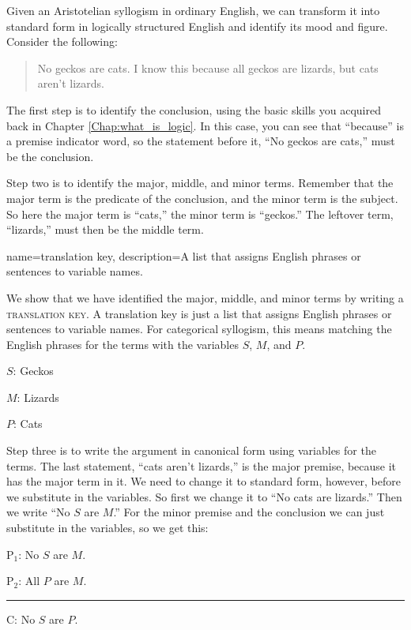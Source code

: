Given an Aristotelian syllogism in ordinary English, we can transform it into standard form in logically structured English and identify its mood and figure. Consider the following: 

\begin{quotation}
\noindent No geckos are cats. I know this because all geckos are lizards, but cats aren't lizards.
\end{quotation}

The first step is to identify the conclusion, using the basic skills you acquired back in Chapter \ref{Chap:what_is_logic}. In this case, you can see that ``because'' is a premise indicator word, so the statement before it, ``No geckos are cats,'' must be the conclusion.

Step two is to identify the major, middle, and minor terms. Remember that the major term is the predicate of the conclusion, and the minor term is the subject. So here the major term is ``cats,'' the minor term is ``geckos.'' The leftover term, ``lizards,'' must then be the middle term. 


{
name=translation key,
description={A list that assigns English phrases or sentences to variable names.}
}

We show that we have identified the major, middle, and minor terms by writing a \textsc{\gls{translation key}}. \label{def:translation_key} A translation key is just a list that assigns English phrases or sentences to variable names. For categorical syllogism, this means matching the English phrases for the terms with the variables $S$, $M$, and $P$. 

\begin{ekey}
\item[$S$:] Geckos
\item[$M$:] Lizards
\item[$P$:] Cats
\end{ekey}

Step three is to write the argument in canonical form using variables for the terms. The last statement, ``cats aren't lizards,'' is the major premise, because it has the major term in it. We need to change it to standard form, however, before we substitute in the variables. So first we change it to ``No cats are lizards.'' Then we write ``No $S$ are $M$.'' For the minor premise and the conclusion we can just substitute in the variables, so we get this:
 
\begin{earg}
\item[P$_1$:] No $S$ are $M$.
\item[P$_2$:] All $P$ are $M$.
\vspace{-.5em}
\item [] \rule{0.15\linewidth}{.5pt} 
\item[C:] No $S$ are $P$. 
\end{earg} 

